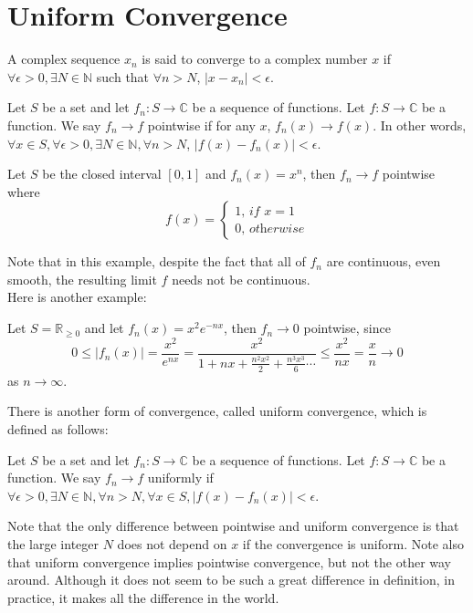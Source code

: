 \section{Uniform Convergence}
\begin{definition}
    A complex sequence $x_n$ is said to converge to a complex number $x$ if $\forall\epsilon>0,\exists N\in\mathbb N$ such that $\forall n>N$, $|x-x_n|<\epsilon$.
\end{definition}
\begin{definition}
    Let $S$ be a set and let $f_n:S\to\mathbb C$ be a sequence of functions.
    Let $f:S\to\mathbb C$ be a function.
    We say $f_n\to f$ pointwise if for any $x$, $f_n(x)\to f(x)$.
    In other words, $\forall x\in S, \forall\epsilon>0, \exists N\in\mathbb N, \forall n>N$, $|f(x)-f_n(x)|<\epsilon$.
\end{definition}
\begin{example}
    Let $S$ be the closed interval $[0,1]$ and $f_n(x)=x^n$, then $f_n\to f$ pointwise where
    $$f(x)=
    \begin{cases}
        1\textit{, if $x=1$}\\
        0\textit{, otherwise}
    \end{cases}$$
\end{example}
Note that in this example, despite the fact that all of $f_n$ are continuous, even smooth, the resulting limit $f$ needs not be continuous.\\
Here is another example:
\begin{example}
    Let $S=\mathbb R_{\ge 0}$ and let $f_n(x)=x^2e^{-nx}$, then $f_n\to 0$ pointwise, since
    $$0\le |f_n(x)|=\frac{x^2}{e^{nx}}= \frac{x^2}{1+nx+\frac{n^2x^2}{2}+\frac{n^3x^3}{6}\cdots}\le\frac{x^2}{nx}=\frac{x}{n}\to0$$
    as $n\to\infty$.
\end{example}
There is another form of convergence, called uniform convergence, which is defined as follows:
\begin{definition}
    Let $S$ be a set and let $f_n:S\to\mathbb C$ be a sequence of functions.
    Let $f:S\to\mathbb C$ be a function.
    We say $f_n\to f$ uniformly if $\forall\epsilon>0, \exists N\in\mathbb N, \forall n>N, \forall x\in S, |f(x)-f_n(x)|<\epsilon$.
\end{definition}
Note that the only difference between pointwise and uniform convergence is that the large integer $N$ does not depend on $x$ if the convergence is uniform.
Note also that uniform convergence implies pointwise convergence, but not the other way around.
Although it does not seem to be such a great difference in definition, in practice, it makes all the difference in the world.
